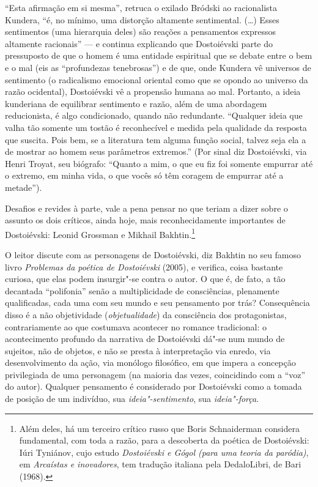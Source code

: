 ``Esta afirmação em si mesma'', retruca o exilado Bródski ao
racionalista Kundera, ``é, no mínimo, uma distorção altamente
sentimental. (\ldots{}) Esses sentimentos (uma hierarquia deles) são reações
a pensamentos expressos altamente racionais'' --- e continua explicando
que Dostoiévski parte do pressuposto de que o homem é uma entidade
espiritual que se debate entre o bem e o mal (eis as ``profundezas
tenebrosas'') e de que, onde Kundera vê universos de sentimento (o
radicalismo emocional oriental como que se opondo ao universo da razão
ocidental), Dostoiévski vê a propensão humana ao mal. Portanto, a ideia
kunderiana de equilibrar sentimento e razão, além de uma abordagem
reducionista, é algo condi­cionado, quando não redundante. ``Qualquer
ideia que valha tão somente um tostão é reconhecível e medida pela
qualidade da resposta que suscita. Pois bem, se a literatura tem alguma
função social, talvez seja ela a de mostrar ao homem seus parâmetros
extremos.'' (Por sinal diz Dostoiévski, via Henri Troyat, seu biógrafo:
``Quanto a mim, o que eu fiz foi somente empurrar até o extremo, em
minha vida, o que vocês só têm coragem de empurrar até a metade'').


Desafios e revides à parte, vale a pena pensar no que teriam a dizer
sobre o assunto os dois críticos, ainda hoje, mais reconhecidamente
importantes de Dostoiévski: Leonid Grossman e Mikhail Bakhtin.\footnote{Além
deles, há um terceiro crítico russo que Boris Schnaiderman considera
fundamental, com toda a razão, para a descoberta da poética de
Dostoiévski: Iúri Tyniánov, cujo estudo \emph{Dostoiévski e Gógol
(para uma teoria da paródia)}, em \emph{Arcaístas e inovadores},
tem tradução italiana pela DedaloLibri, de Bari (1968).}

O leitor discute com as personagens de Dostoiévski, diz Bakhtin no seu
famoso livro \emph{Problemas da poética de Dostoiévski} (2005), e
verifica, coisa bastante curiosa, que elas podem insurgir"-se contra o
autor. O que é, de fato, a tão decantada ``polifonia'' senão a
multiplicidade de consciências, plena­mente qualificadas, cada uma com
seu mundo e seu pensamento por trás? Consequência disso é a não
objetividade (\emph{objetualidade}) da consciência dos protagonistas,
contrariamente ao que costumava acontecer no romance tradicional: o
acontecimento profundo da narrativa de Dostoiévski dá"-se num mundo de
sujeitos, não de objetos, e não se presta à interpre­tação via enredo,
via desenvolvimento da ação, via monólogo filosófico, em que impera a
concepção privilegiada de uma personagem (na maioria das vezes,
coincidindo com a ``voz'' do autor). Qualquer pensamento é considerado
por Dostoiévski como a tomada de posição de um indivíduo, sua
\emph{ideia"-sentimento}, sua \emph{ideia"-força}.

